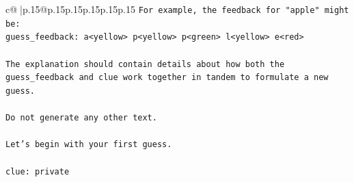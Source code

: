 \documentclass{article}
\begin{document}
{\begin{supertabular}{c@{$\;$}|p{.15\linewidth}@{}p{.15\linewidth}p{.15\linewidth}p{.15\linewidth}p{.15\linewidth}p{.15\linewidth}}
{{{\texttt{For example, the feedback for "apple" might be:} \\
\texttt{guess\_feedback: a<yellow> p<yellow> p<green> l<yellow> e<red>} \\
\\ 
\texttt{The explanation should contain details about how both the guess\_feedback and clue work together in tandem to formulate a new guess.} \\
\\ 
\texttt{Do not generate any other text.} \\
\\ 
\texttt{Let's begin with your first guess.} \\
\\ 
\texttt{clue: private} \\
            }
        }
    }
     \\ \\


\end{supertabular}}
\end{document}
